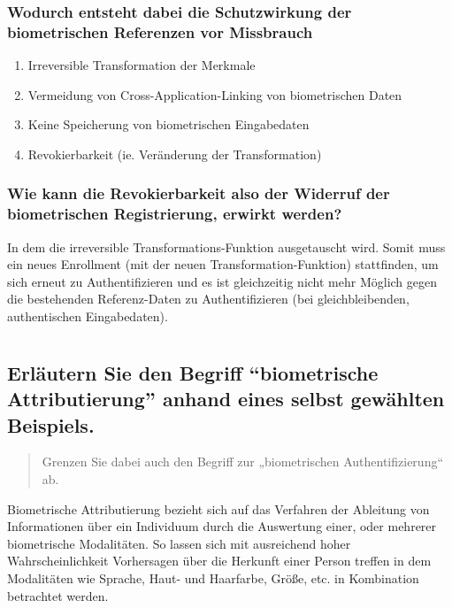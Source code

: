 \documentclass{article}
\newcommand{\annotation}[1]{
    \begin{quote}
    	\begin{textit}{#1}\end{textit}
    \end{quote}
}
\begin{document}
\subsubsection{Wodurch entsteht dabei die Schutzwirkung der biometrischen Referenzen vor Missbrauch}

\begin{enumerate}
    \item Irreversible Transformation der Merkmale
    \item Vermeidung von Cross-Application-Linking von biometrischen Daten
    \item Keine Speicherung von biometrischen Eingabedaten
    \item Revokierbarkeit (ie. Veränderung der Transformation)
\end{enumerate}

\subsubsection{Wie kann die Revokierbarkeit also der Widerruf der biometrischen Registrierung, erwirkt
werden?}

In dem die irreversible Transformations-Funktion ausgetauscht wird. Somit muss ein neues Enrollment
(mit der neuen Transformation-Funktion) stattfinden, um sich erneut zu Authentifizieren und es ist gleichzeitig nicht mehr Möglich
gegen die bestehenden Referenz-Daten zu Authentifizieren (bei gleichbleibenden, authentischen Eingabedaten).

\section{}

\subsection{Erläutern Sie den Begriff ``biometrische Attributierung'' anhand eines selbst gewählten Beispiels.}

\annotation{Grenzen Sie dabei auch den Begriff zur „biometrischen Authentifizierung“ ab.}

Biometrische Attributierung bezieht sich auf das Verfahren der Ableitung von Informationen über ein Individuum durch 
die Auswertung einer, oder mehrerer biometrische Modalitäten. So lassen sich mit ausreichend hoher Wahrscheinlichkeit
Vorhersagen über die Herkunft einer Person treffen in dem Modalitäten wie Sprache, Haut- und Haarfarbe, Größe, etc. in 
Kombination betrachtet werden.
\end{document}
